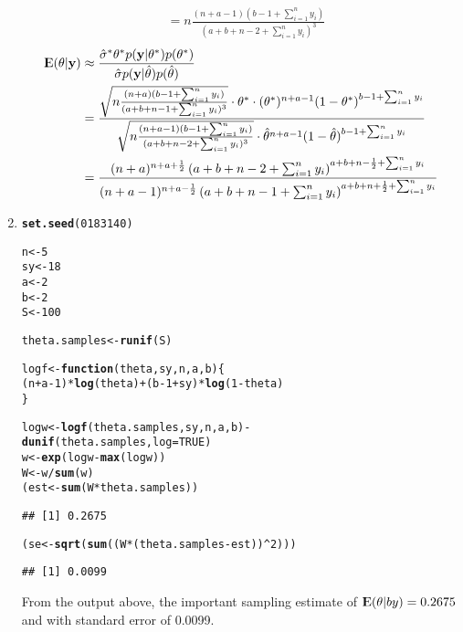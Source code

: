 \documentclass[a4paper,12pt]{article}\usepackage[]{graphicx}\usepackage[]{color}
\makeatletter
\newcommand{\hlnum}[1]{\textcolor[rgb]{0.686,0.059,0.569}{#1}}%
\newcommand{\hlopt}[1]{\textcolor[rgb]{0,0,0}{#1}}%
\newcommand{\hlstd}[1]{\textcolor[rgb]{0.345,0.345,0.345}{#1}}%
\newcommand{\hlkwa}[1]{\textcolor[rgb]{0.161,0.373,0.58}{\textbf{#1}}}%
\newcommand{\hlkwb}[1]{\textcolor[rgb]{0.69,0.353,0.396}{#1}}%
\newcommand{\hlkwc}[1]{\textcolor[rgb]{0.333,0.667,0.333}{#1}}%
\newcommand{\hlkwd}[1]{\textcolor[rgb]{0.737,0.353,0.396}{\textbf{#1}}}%
\newenvironment{kframe}{%
 \def\at@end@of@kframe{}%
 \ifinner\ifhmode%
  \def\at@end@of@kframe{\end{minipage}}%
  \begin{minipage}{\columnwidth}%
 \fi\fi%
 \def\FrameCommand##1{\hskip\@totalleftmargin \hskip-\fboxsep
 \colorbox{shadecolor}{##1}\hskip-\fboxsep
     \hskip-\linewidth \hskip-\@totalleftmargin \hskip\columnwidth}%
 \MakeFramed {\advance\hsize-\width
   \@totalleftmargin\z@ \linewidth\hsize
   \@setminipage}}%
 {\par\unskip\endMakeFramed%
 \at@end@of@kframe}
\newenvironment{knitrout}{}{} %
\newcommand{\Expect}{{\rm I\kern-.3em E}}
\newcommand{\by}{\mathbf{y}}
\makeatother
\begin{document}
\begin{enumerate}[label=(\alph*)]
\begin{align*}
&= n\frac{(n+a-1)(b-1+\sum_{i=1}^ny_i)}{\left(a+b+n-2+\sum_{i=1}^ny_i\right)^3}
\end{align*}
\begin{align*}
\Expect(\theta|\by)&\approx\frac{\hat\sigma^*\theta^*p(\by|\theta^*)p(\theta^*)}{\hat\sigma p(\by|\hat\theta)p(\hat\theta)} \\
&=\frac{\sqrt{n\frac{(n+a)(b-1+\sum_{i=1}^ny_i)}{(a+b+n-1+\sum_{i=1}^ny_i)^3}}\cdot\theta^*\cdot(\theta^*)^{n+a-1}(1-\theta^*)^{b-1+\sum_{i=1}^ny_i}}{\sqrt{n\frac{(n+a-1)(b-1+\sum_{i=1}^ny_i)}{(a+b+n-2+\sum_{i=1}^ny_i)^3}}\cdot\hat\theta^{n+a-1}(1-\hat\theta)^{b-1+\sum_{i=1}^ny_i}} \\
&=\frac{(n+a)^{n+a+\frac{1}{2}}\left(a+b+n-2+\sum_{i=1}^ny_i\right)^{a+b+n-\frac{1}{2}+\sum_{i=1}^ny_i}}{(n+a-1)^{n+a-\frac{1}{2}}\left(a+b+n-1+\sum_{i=1}^ny_i\right)^{a+b+n+\frac{1}{2}+\sum_{i=1}^ny_i}}
\end{align*}
\item 
\begin{knitrout}\footnotesize
{}\color{fgcolor}\begin{kframe}
\begin{alltt}
\hlkwd{set.seed}\hlstd{(}\hlnum{0183140}\hlstd{)}

\hlstd{n} \hlkwb{<-} \hlnum{5}
\hlstd{sy} \hlkwb{<-} \hlnum{18}
\hlstd{a} \hlkwb{<-} \hlnum{2}
\hlstd{b} \hlkwb{<-} \hlnum{2}
\hlstd{S} \hlkwb{<-} \hlnum{100}

\hlstd{theta.samples} \hlkwb{<-} \hlkwd{runif}\hlstd{(S)}

\hlstd{logf} \hlkwb{<-} \hlkwa{function}\hlstd{(}\hlkwc{theta}\hlstd{,} \hlkwc{sy}\hlstd{,} \hlkwc{n}\hlstd{,} \hlkwc{a}\hlstd{,} \hlkwc{b}\hlstd{) \{}
        \hlstd{(n}\hlopt{+}\hlstd{a}\hlopt{-}\hlnum{1}\hlstd{)}\hlopt{*}\hlkwd{log}\hlstd{(theta)} \hlopt{+} \hlstd{(b}\hlopt{-}\hlnum{1}\hlopt{+}\hlstd{sy)}\hlopt{*}\hlkwd{log}\hlstd{(}\hlnum{1}\hlopt{-}\hlstd{theta)}
\hlstd{\}}

\hlstd{logw} \hlkwb{<-} \hlkwd{logf}\hlstd{(theta.samples, sy, n, a, b)} \hlopt{-}
        \hlkwd{dunif}\hlstd{(theta.samples,} \hlkwc{log} \hlstd{=} \hlnum{TRUE}\hlstd{)}
\hlstd{w} \hlkwb{<-} \hlkwd{exp}\hlstd{(logw} \hlopt{-} \hlkwd{max}\hlstd{(logw))}
\hlstd{W} \hlkwb{<-} \hlstd{w}\hlopt{/}\hlkwd{sum}\hlstd{(w)}
\hlstd{(est} \hlkwb{<-} \hlkwd{sum}\hlstd{(W}\hlopt{*}\hlstd{theta.samples))}
\end{alltt}
\begin{verbatim}
## [1] 0.2675
\end{verbatim}
\begin{alltt}
\hlstd{(se} \hlkwb{<-} \hlkwd{sqrt}\hlstd{(}\hlkwd{sum}\hlstd{((W}\hlopt{*}\hlstd{(theta.samples} \hlopt{-} \hlstd{est))}\hlopt{^}\hlnum{2}\hlstd{)))}
\end{alltt}
\begin{verbatim}
## [1] 0.0099
\end{verbatim}
\end{kframe}
\end{knitrout}
From the output above, the important sampling estimate of $\Expect(\theta|by)=0.2675$ and with standard error of 0.0099.
\end{enumerate}
\newpage
\end{document}
